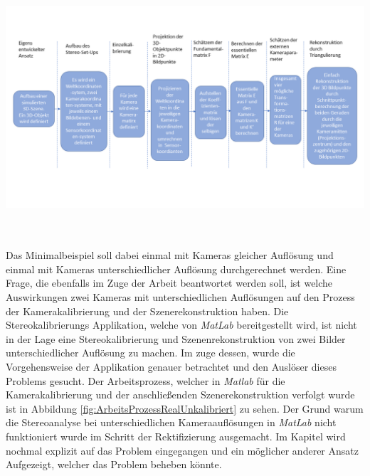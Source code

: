 \begin{minipage}{\linewidth}
	\centering
	\includegraphics[width=1.\linewidth]{images/ArbeitsProzessMinimal.png}
	\label{fig:ArbeitsProzessMinimal}
\end{minipage}\\ \\

Das Minimalbeispiel soll dabei einmal mit Kameras gleicher Auflösung und einmal mit Kameras unterschiedlicher Auflösung durchgerechnet werden. Eine Frage, die ebenfalls im Zuge der Arbeit beantwortet werden soll, ist welche Auswirkungen zwei Kameras mit unterschiedlichen Auflösungen auf den Prozess der Kamerakalibrierung und der Szenerekonstruktion haben. Die Stereokalibrierungs Applikation, welche von \textit{MatLab} bereitgestellt wird, ist nicht in der Lage eine Stereokalibrierung und Szenenrekonstruktion von zwei Bilder unterschiedlicher Auflösung zu machen. Im zuge dessen, wurde die Vorgehensweise der Applikation genauer betrachtet und den Auslöser dieses Problems gesucht. Der Arbeitsprozess, welcher in \textit{Matlab} für die Kamerakalibrierung und der anschließenden Szenerekonstruktion verfolgt wurde ist in Abbildung \ref{fig:ArbeitsProzessRealUnkalibriert} zu sehen. Der Grund warum die Stereoanalyse bei unterschiedlichen Kameraauflösungen in \textit{MatLab} nicht funktioniert wurde im Schritt der Rektifizierung ausgemacht. Im Kapitel  wird nochmal explizit auf das Problem eingegangen und ein möglicher anderer Ansatz Aufgezeigt, welcher das Problem beheben könnte.


